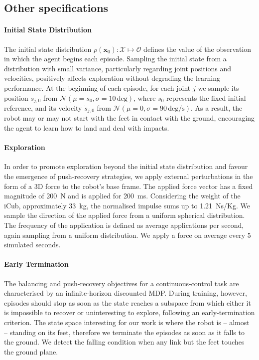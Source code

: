 \subsection{Other specifications}\label{sec:env-other}

\paragraph{Initial State Distribution}

The initial state distribution $\rho(\mathbf{x}_0): \mathcal{X} \mapsto \mathcal{O}$ defines the value of the observation in which the agent begins each episode.
Sampling the initial state from a distribution with small variance, particularly regarding joint positions and velocities, positively affects exploration without degrading the learning performance.
At the beginning of each episode, for each joint $j$ we sample its position $s_{j,0}$ from $\mathcal{N}(\mu=s_0, \sigma=10 \, \text{deg})$, where $s_{0}$ represents the fixed initial reference, and its velocity $\dot{s}_{j,0}$ from $\mathcal{N}(\mu=0, \sigma=90 \, \text{deg/s})$.
As a result, the robot may or may not start with the feet in contact with the ground, encouraging the agent to learn how to land and deal with impacts.

\paragraph{Exploration}

In order to promote exploration beyond the initial state distribution and favour the emergence of push-recovery strategies, we apply external perturbations in the form of a 3D force to the robot's base frame.
The applied force vector has a fixed magnitude of 200~N and is applied for 200~ms.
Considering the weight of the iCub, approximately 33~kg, the normalised impulse sums up to 1.21~Ns/Kg.
We sample the direction of the applied force from a uniform spherical distribution.
The frequency of the application is defined as average applications per second, again sampling from a uniform distribution.
We apply a force on average every 5 simulated seconds.

\paragraph{Early Termination}

The balancing and push-recovery objectives for a continuous-control task are characterised by an infinite-horizon discounted \ac{MDP}.
During training, however, episodes should stop as soon as the state reaches a subspace from which either it is impossible to recover or uninteresting to explore, following an early-termination criterion.
The state space interesting for our work is where the robot is -- almost -- standing on its feet, therefore we terminate the episodes as soon as it falls to the ground.
We detect the falling condition when any link but the feet touches the ground plane.

